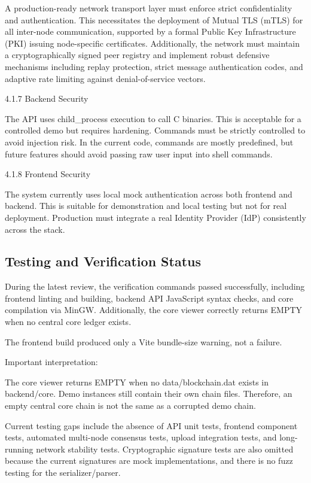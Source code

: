 \documentclass[12pt]{article}
\begin{document}
A production-ready network transport layer must enforce strict confidentiality and authentication. This necessitates the deployment of Mutual TLS (mTLS) for all inter-node communication, supported by a formal Public Key Infrastructure (PKI) issuing node-specific certificates. Additionally, the network must maintain a cryptographically signed peer registry and implement robust defensive mechanisms including replay protection, strict message authentication codes, and adaptive rate limiting against denial-of-service vectors.

4.1.7 Backend Security

The API uses child\_process execution to call C binaries. This is acceptable for a controlled demo but requires hardening. Commands must be strictly controlled to avoid injection risk. In the current code, commands are mostly predefined, but future features should avoid passing raw user input into shell commands.

4.1.8 Frontend Security

The system currently uses local mock authentication across both frontend and backend. This is suitable for demonstration and local testing but not for real deployment. Production must integrate a real Identity Provider (IdP) consistently across the stack.

\subsection{Testing and Verification Status}

During the latest review, the verification commands passed successfully, including frontend linting and building, backend API JavaScript syntax checks, and core compilation via MinGW. Additionally, the core viewer correctly returns EMPTY when no central core ledger exists.

The frontend build produced only a Vite bundle-size warning, not a failure.

Important interpretation:

The core viewer returns EMPTY when no data/blockchain.dat exists in backend/core. Demo instances still contain their own chain files. Therefore, an empty central core chain is not the same as a corrupted demo chain.

Current testing gaps include the absence of API unit tests, frontend component tests, automated multi-node consensus tests, upload integration tests, and long-running network stability tests. Cryptographic signature tests are also omitted because the current signatures are mock implementations, and there is no fuzz testing for the serializer/parser.
\end{document}
